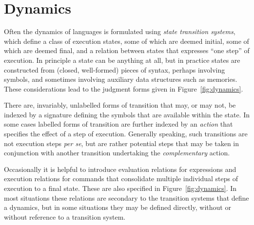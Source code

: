\documentclass[11pt]{article}
\begin{document}
\section*{Dynamics}
\label{sec:dynamics}

Often the dynamics of languages is formulated using \emph{state transition systems}, which define a class of execution states, some of which are deemed initial, some of which are deemed final, and a relation between states that expresses ``one step'' of execution.  In principle a state can be anything at all, but in practice states are constructed from (closed, well-formed) pieces of syntax, perhaps involving symbols, and sometimes involving auxiliary data structures such as memories.  These considerations lead to the judgment forms given in Figure~\ref{fig:dynamics}.

There are, invariably, unlabelled forms of transition that may, or may not, be indexed by a signature defining the symbols that are available within the state.  In some cases labelled forms of transition are further indexed by an \emph{action} that specifies the effect of a step of execution.  Generally speaking, such transitions are not execution steps \textit{per se}, but are rather potential steps that may be taken in conjunction with another transition undertaking the \emph{complementary} action.

Occasionally it is helpful to introduce evaluation relations for expressions and execution relations for commands that consolidate multiple individual steps of execution to a final state.  These are also specified in Figure~\ref{fig:dynamics}.  In most situations these relations are secondary to the transition systems that define a dynamics, but in some situations they may be defined directly, without or without reference to a transition system.
\end{document}
